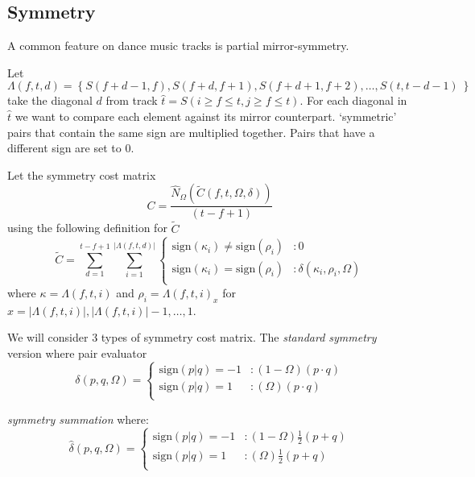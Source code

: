 \documentclass[twocolumn]{article}
\begin{document}
	\subsection{Symmetry}	
	
	A common feature on dance music tracks is partial mirror-symmetry.
	
	Let \begin{dmath*}
		\Lambda( f,t,d ) = \left\{ 
		S(f+d-1,f), S(f+d, f+1), S(f+d+1, f+2),\ldots, S(t, t-d-1)
		~ \right\} 
	\end{dmath*}take the diagonal $d$ from track $\hat t= S( i \ge f \le t, j \ge f \le t)$. For each diagonal in $\hat t$ we want to compare each element against its mirror counterpart. `symmetric' pairs that contain the same sign are multiplied together. Pairs that have a different sign are set to $0$.
	
	Let the symmetry cost matrix
	\begin{dmath*} C = \frac{ \hat N_\Omega( \tilde C(f, t, \Omega, \delta))}{(t-f+1)}\end{dmath*} using the following definition for $\tilde C$
	\begin{dmath*}\tilde C=	\sum_{d=1}^{t-f+1} 
		\sum_{i=1}^{|\Lambda( f,t,d )|}{ \left\{
			\begin{array}{lr}
				\mathrm{sign}( \kappa_{i} ) \ne \mathrm{sign}( \rho_i )  & : 0   \\
				\mathrm{sign}( \kappa_{i} ) = \mathrm{sign}( \rho_i ) & : \delta( \kappa_{i}, \rho_i, \Omega )  \\
			\end{array}
			\right.}
	\end{dmath*}  where  $\kappa=\Lambda( f,t,i )$ and $\rho_i = \Lambda( f,t,i )_x$ for $x=|\Lambda( f,t,i )|, |\Lambda( f,t,i )|-1,\ldots,1$. 
	
	We will consider $3$ types of symmetry cost matrix. The \textit{standard symmetry} version where pair evaluator 
		\begin{dmath*}\delta( p,q, \Omega ) = \left\{
				\begin{array}{lr}
					\mathrm{sign}(p|q)=-1  & : (1-\Omega) ( p \cdot q ) \\
					\mathrm{sign}(p|q)= 1  & : (\Omega) ( p \cdot q )    \\
				\end{array}
				\right.
		\end{dmath*}
		
		\textit{symmetry summation} where:
		\begin{dmath*}\hat \delta( p,q, \Omega ) = \left\{
			\begin{array}{lr}
				\mathrm{sign}(p|q)=-1  & : (1-\Omega) \frac{1}{2} ( p + q ) \\
				\mathrm{sign}(p|q)= 1  & : (\Omega) \frac{1}{2} ( p + q )    \\
			\end{array}
			\right.
	\end{dmath*}
	
\end{document}
